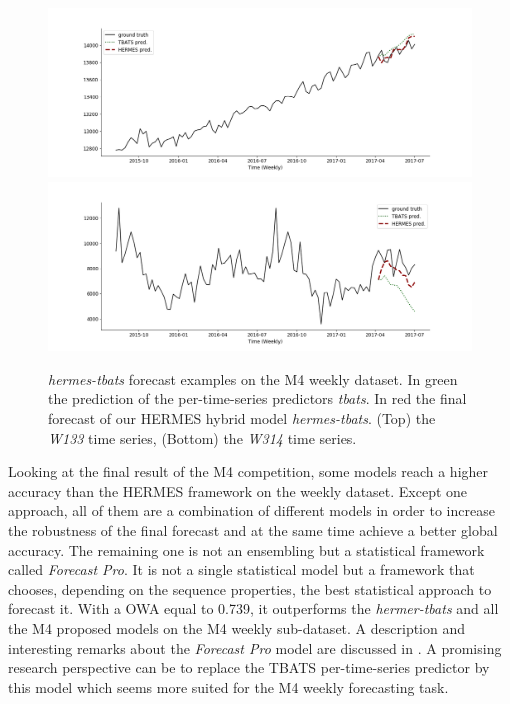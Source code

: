 \documentclass[lettersize,journal]{IEEEtran}
\begin{document}
\begin{figure}
\centering
  \includegraphics[width=1.\linewidth]{figure/W133_pred}
  \includegraphics[width=1.\linewidth]{figure/W314_pred}
\caption{\textit{hermes-tbats} forecast examples on the M4 weekly dataset. In green the prediction of the per-time-series predictors \textit{tbats}. In red the final forecast of our HERMES hybrid model \textit{hermes-tbats}. (Top) the \textit{W133} time series, (Bottom) the \textit{W314} time series.}
\label{fig:m4pred}
\end{figure}


Looking at the final result of the M4 competition, some models reach a higher accuracy than the HERMES framework on the weekly dataset. Except one approach, all of them are a combination of different models in order to increase the robustness of the final forecast and at the same time achieve a better global accuracy. The remaining one is not an ensembling but a statistical framework called \textit{Forecast Pro}. It is not a single statistical model but a framework that chooses, depending on the sequence properties, the best statistical approach to forecast it. With a OWA equal to 0.739, it outperforms the \textit{hermer-tbats} and all the M4 proposed models on the M4 weekly sub-dataset. A description and interesting remarks about the \textit{Forecast Pro} model are discussed in \cite{DARIN2020135}. A promising research perspective can be to replace the TBATS per-time-series predictor by this model which seems more suited for the M4 weekly forecasting task.
\end{document}
